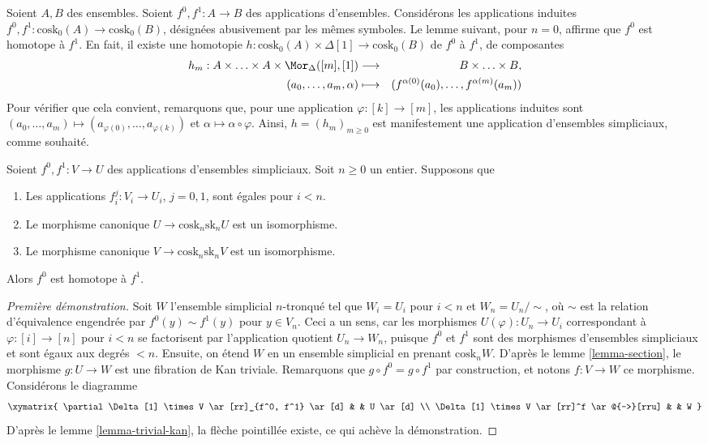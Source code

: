 \noindent
Soient $A, B$ des ensembles. Soient $f^0, f^1 : A \to B$ des applications
d'ensembles. Considérons les applications induites
$f^0, f^1 : \text{cosk}_0(A) \to \text{cosk}_0(B)$, désignées abusivement
par les mêmes symboles. Le lemme suivant, pour $n = 0$, affirme que $f^0$
est homotope à $f^1$. En fait, il existe une homotopie
$h : \text{cosk}_0(A) \times \Delta[1] \to \text{cosk}_0(B)$
de $f^0$ à $f^1$, de composantes
\begin{eqnarray*}
h_m : A \times \ldots \times A \times \Mor_{\Delta}([m], [1])
& \longrightarrow &
B \times \ldots \times B, \\
(a_0, \ldots, a_m, \alpha) & \longmapsto &
(f^{\alpha(0)}(a_0), \ldots, f^{\alpha(m)}(a_m))
\end{eqnarray*}
Pour vérifier que cela convient, remarquons que, pour une application
$\varphi : [k] \to [m]$, les applications induites sont
$(a_0, \ldots, a_m) \mapsto (a_{\varphi(0)}, \ldots, a_{\varphi(k)})$
et $\alpha \mapsto \alpha \circ \varphi$. Ainsi, $h = (h_m)_{m \geq 0}$
est manifestement une application d'ensembles simpliciaux, comme souhaité.

\begin{lemma}
\label{lemma-homotopy}
Soient $f^0, f^1 : V \to U$ des applications d'ensembles simpliciaux.
Soit $n \geq 0$ un entier.
Supposons que
\begin{enumerate}
\item Les applications $f^j_i : V_i \to U_i$, $j = 0, 1$, sont égales pour $i < n$.
\item Le morphisme canonique $U \to \text{cosk}_n \text{sk}_n U$
est un isomorphisme.
\item Le morphisme canonique $V \to \text{cosk}_n \text{sk}_n V$
est un isomorphisme.
\end{enumerate}
Alors $f^0$ est homotope à $f^1$.
\end{lemma}

\begin{proof}[Première démonstration]
Soit $W$ l'ensemble simplicial $n$-tronqué tel que $W_i = U_i$ pour
$i < n$ et $W_n = U_n / \sim$, où $\sim$ est la relation d'équivalence
engendrée par $f^0(y) \sim f^1(y)$ pour $y \in V_n$. Ceci a un sens, car les
morphismes $U(\varphi) : U_n \to U_i$ correspondant à
$\varphi : [i] \to [n]$ pour $i < n$ se factorisent par l'application
quotient $U_n \to W_n$, puisque $f^0$ et $f^1$ sont des morphismes
d'ensembles simpliciaux et sont égaux aux degrés $< n$. Ensuite, on étend
$W$ en un ensemble simplicial en prenant $\text{cosk}_n W$. D'après le
lemme \ref{lemma-section}, le morphisme $g : U \to W$ est une fibration de
Kan triviale. Remarquons que $g \circ f^0 = g \circ f^1$ par construction,
et notons $f : V \to W$ ce morphisme. Considérons le diagramme
$$
\xymatrix{
\partial \Delta[1] \times V \ar[rr]_{f^0, f^1} \ar[d] & & U \ar[d] \\
\Delta[1] \times V \ar[rr]^f \ar@{-->}[rru] & & W
}
$$
D'après le lemme \ref{lemma-trivial-kan}, la flèche pointillée existe, ce
qui achève la démonstration.
\end{proof}

